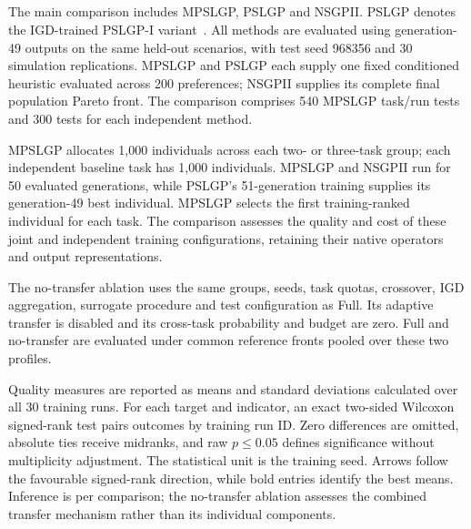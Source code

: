 \subsection{}
\begingroup
\color{resultrevision}
The main comparison includes MPSLGP, PSLGP and NSGPII. PSLGP denotes the IGD-trained PSLGP-I variant~\cite{xu2026pslgp}. All methods are evaluated using generation-49 outputs on the same held-out scenarios, with test seed 968356 and 30 simulation replications. MPSLGP and PSLGP each supply one fixed conditioned heuristic evaluated across 200 preferences; NSGPII supplies its complete final population Pareto front. The comparison comprises 540 MPSLGP task/run tests and 300 tests for each independent method.

MPSLGP allocates 1,000 individuals across each two- or three-task group; each independent baseline task has 1,000 individuals. MPSLGP and NSGPII run for 50 evaluated generations, while PSLGP's 51-generation training supplies its generation-49 best individual. MPSLGP selects the first training-ranked individual for each task. The comparison assesses the quality and cost of these joint and independent training configurations, retaining their native operators and output representations.

The no-transfer ablation uses the same groups, seeds, task quotas, crossover, IGD aggregation, surrogate procedure and test configuration as Full. Its adaptive transfer is disabled and its cross-task probability and budget are zero. Full and no-transfer are evaluated under common reference fronts pooled over these two profiles.

Quality measures are reported as means and standard deviations calculated over all 30 training runs. For each target and indicator, an exact two-sided Wilcoxon signed-rank test pairs outcomes by training run ID. Zero differences are omitted, absolute ties receive midranks, and raw $p\leq0.05$ defines significance without multiplicity adjustment. The statistical unit is the training seed. Arrows follow the favourable signed-rank direction, while bold entries identify the best means. Inference is per comparison; the no-transfer ablation assesses the combined transfer mechanism rather than its individual components.
\endgroup